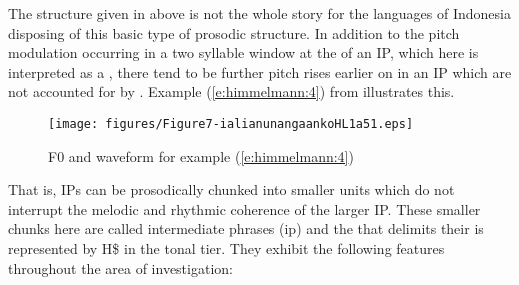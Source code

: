 \documentclass[output=paper
,modfonts
,nonflat]{langsci/langscibook}
\begin{document}
The structure given in  above is not the whole story for the  languages of Indonesia disposing of this basic type of prosodic structure. In addition to the pitch modulation occurring in a two syllable window at the  of an IP, which here is interpreted as a , there tend to be further pitch rises earlier on in an IP which are not accounted for by . Example (\ref{e:himmelmann:4}) from  illustrates this.


\begin{figure}
	\texttt{[image: figures/Figure7-ialianunangaankoHL1a51.eps]}
	\caption{F0 and waveform for example (\ref{e:himmelmann:4})}
	\label{f7}
\end{figure}

\noindent
That is, IPs can be prosodically chunked into smaller units which do not interrupt the melodic and rhythmic coherence of the larger IP. These smaller chunks here are called intermediate phrases (ip) and the  that delimits their  is represented by H\$ in the tonal tier. They exhibit the following features throughout the area of investigation:
\end{document}
